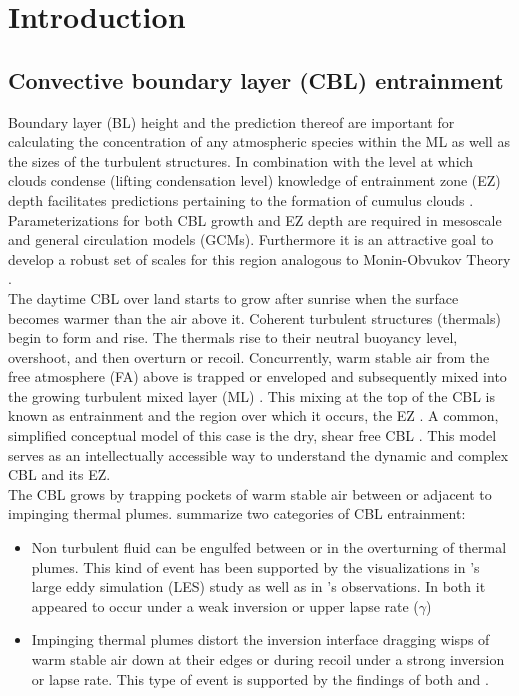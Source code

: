 \section{Introduction}
\label{intro}


\subsection{Convective boundary layer (CBL) entrainment}
\label{sec:cblent}
Boundary layer (BL) height and the prediction thereof are important for calculating the concentration of any atmospheric species within the ML as well as the sizes of the turbulent structures.  In combination with the level at which clouds condense (lifting condensation level) knowledge of entrainment zone (EZ) depth facilitates predictions pertaining to the formation of cumulus clouds \cite{WilStu}.  Parameterizations for both CBL growth and EZ depth are required in mesoscale and general circulation models (GCMs).  Furthermore it is an attractive goal to develop a robust set of scales for this region analogous to Monin-Obvukov Theory \citep{Stull-BLMetIntro, Traum11, SteynBaldHoff, StullNelEl, Sorbjan1}.\\

The daytime CBL over land starts to grow after sunrise when the surface becomes warmer than the air above it.  Coherent turbulent structures (thermals) begin to form and rise. The thermals rise to their neutral buoyancy level, overshoot, and then overturn or recoil.  Concurrently, warm stable air from the free atmosphere (FA) above is trapped or enveloped and subsequently mixed into the growing turbulent mixed layer (ML) \citep{Stull-BLMetIntro}.  This mixing at the top of the CBL is known as entrainment and the region over which it occurs, the EZ \citep{DearWill80}. A common, simplified conceptual model of this case is the dry, shear free CBL \citep{SullMoengStev, FedConzMir04, BrooksFowler2}. This model serves as an intellectually accessible way to understand the dynamic and complex CBL and its EZ.\\

The CBL grows by trapping pockets of warm stable air between
or adjacent to impinging thermal plumes.  \citep{Traum11} summarize two categories of CBL entrainment:\\

\begin{itemize}

\item{Non turbulent fluid can be engulfed between or in the overturning of thermal plumes. This kind of event has been supported by the visualizations in \cite{SullMoengStev}'s large eddy simulation (LES) study as well as in \cite{Traum11}'s observations. In both it appeared to occur under a weak inversion or upper lapse rate ($\gamma$)}

\item{
Impinging thermal plumes distort the inversion interface dragging wisps of warm stable air down at their edges or during recoil under a strong inversion or lapse rate. This type of event is supported by the findings  of both \cite{SullMoengStev} and \cite{Traum11}.}

\end{itemize}

